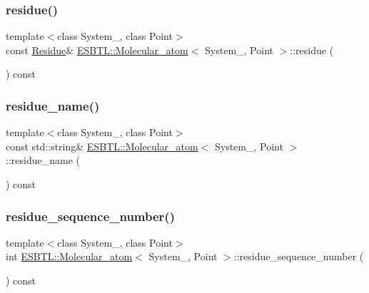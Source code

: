 \subsubsection{\texorpdfstring{residue()}{residue()}}
{\footnotesize\ttfamily template$<$class System\+\_\+, class Point$>$ \\
const \hyperlink{classESBTL_1_1Molecular__atom_a24e68b497c2f43b77ca43be36af7bcd1}{Residue}\& \hyperlink{classESBTL_1_1Molecular__atom}{E\+S\+B\+T\+L\+::\+Molecular\+\_\+atom}$<$ System\+\_\+, Point $>$\+::residue (\begin{DoxyParamCaption}{ }\end{DoxyParamCaption}) const\hspace{0.3cm}{\ttfamily [inline]}}

\mbox{\label{classESBTL_1_1Molecular__atom_a61d6ee7dda9e312112eb433cf96ffa2e}} 
\subsubsection{\texorpdfstring{residue\+\_\+name()}{residue\_name()}}
{\footnotesize\ttfamily template$<$class System\+\_\+, class Point$>$ \\
const std\+::string\& \hyperlink{classESBTL_1_1Molecular__atom}{E\+S\+B\+T\+L\+::\+Molecular\+\_\+atom}$<$ System\+\_\+, Point $>$\+::residue\+\_\+name (\begin{DoxyParamCaption}{ }\end{DoxyParamCaption}) const\hspace{0.3cm}{\ttfamily [inline]}}

\mbox{\label{classESBTL_1_1Molecular__atom_a0ac28cedb09615d293a6b3ed026f52d7}} 
\subsubsection{\texorpdfstring{residue\+\_\+sequence\+\_\+number()}{residue\_sequence\_number()}}
{\footnotesize\ttfamily template$<$class System\+\_\+, class Point$>$ \\
int \hyperlink{classESBTL_1_1Molecular__atom}{E\+S\+B\+T\+L\+::\+Molecular\+\_\+atom}$<$ System\+\_\+, Point $>$\+::residue\+\_\+sequence\+\_\+number (\begin{DoxyParamCaption}{ }\end{DoxyParamCaption}) const\hspace{0.3cm}{\ttfamily [inline]}}

